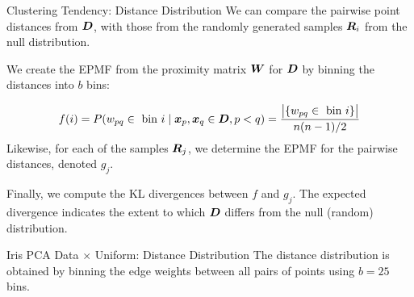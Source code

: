 \begin{frame}{Clustering Tendency: Distance Distribution}
We can compare the pairwise point
distances from ${\boldsymbol D}$, with those from the randomly generated
samples ${\boldsymbol R}_i$ from the null distribution. 

\medskip

We create the EPMF from the proximity matrix ${\boldsymbol W}$ for ${\boldsymbol D}$ by binning the distances into $b$ bins:

\begin{align*}
  f(i) = P(w_{pq} \in \text{ bin } i \;|\; {\boldsymbol x}_p, {\boldsymbol x}_q \in {\boldsymbol D}, p<q) =
  \frac{\bigl|\{w_{pq} \in \text{ bin } i\}\bigr|}{n(n-1)/2}
\end{align*}
Likewise, for each of the samples ${\boldsymbol R}_{j}$, we determine the
EPMF for the pairwise distances, denoted $g_{j}$. 

\medskip
F{i}nally, we 
compute the KL divergences between $f$ and $g_{j}$.
The expected divergence
indicates the extent to which ${\boldsymbol D}$ differs from the null (random)
distribution.
\end{frame}


\begin{frame}[fragile]{Iris PCA Data $\times$ Uniform: Distance Distribution}
\setcounter{subfigure}{0}
The distance distribution is obtained by binning the edge weights
between all pairs of points using $b=25$ bins.

\begin{figure}
  \centering
  \captionsetup[subfloat]{captionskip=30pt}
    \def\pshlabel#1{ {\footnotesize #1}}
    \def\psvlabel#1{ {\footnotesize #1}}
  \centerline{
  }
\end{figure}
\end{frame}

